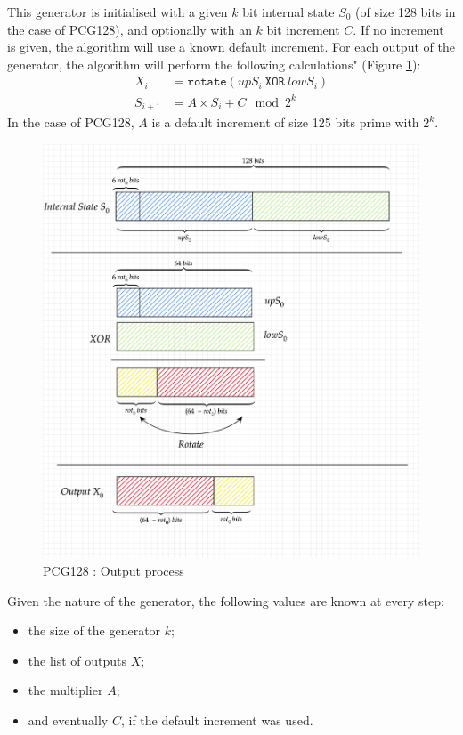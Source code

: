 \documentclass[preprint]{iacrtrans}
\begin{document}
This generator is initialised with a given $k$ bit internal state $S_0$ (of size 128 bits in the case of PCG128), and optionally with an $k$ bit increment $C$. If no increment is given, the algorithm will use a known default increment. For each output of the generator, the algorithm will perform the following calculations" (Figure \ref{pcg128out}):\\
\begin{align}
    X_{i} &= \mathtt{rotate}(upS_i\ \mathtt{XOR}\ lowS_i)\\
    S_{i+1} &= A \times S_{i} + C \mod{2^k}
\end{align}
In the case of PCG128, $A$ is a default increment of size 125 bits prime with $2^k$.

\begin{figure}[h!]
    \centering
    \includegraphics[width=0.75\linewidth]{pictures/PCG128.png}
    \caption{PCG128 : Output process}
    \label{pcg128out}
\end{figure}



Given the nature of the generator, the following values are known at every step:
\begin{itemize}
    \item the size of the generator $k$;
    \item the list of outputs $X$;
    \item the multiplier $A$;
    \item and eventually $C$, if the default increment was used. 
\end{itemize}
\end{document}
